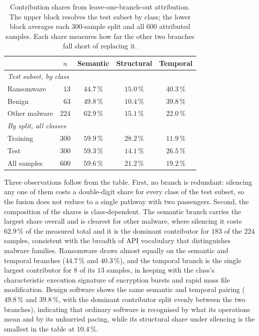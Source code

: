 \documentclass[%
    BCOR=10mm,
    DIV=13,
    toc=bibliography,
    toc=listof,
    oneside,
    12pt,
]{scrbook}
\begin{document}
\begin{table}[H]
\centering
\caption[Branch contribution shares]{Contribution shares from leave-one-branch-out attribution. The upper
block resolves the test subset by class; the lower block averages each
$300$-sample split and all $600$ attributed samples. Each share measures how far
the other two branches fall short of replacing it.}
\label{tab:branch_contributions}
\begin{tabular}{l r ccc}
\toprule
 & \multicolumn{1}{c}{$n$} & \textbf{Semantic} & \textbf{Structural} & \textbf{Temporal} \\
\midrule
\multicolumn{5}{l}{\textit{Test subset, by class}} \\
Ransomware    & $13$  & $44.7\,\%$ & $15.0\,\%$ & $40.3\,\%$ \\
Benign        & $63$  & $49.8\,\%$ & $10.4\,\%$ & $39.8\,\%$ \\
Other malware & $224$ & $62.9\,\%$ & $15.1\,\%$ & $22.0\,\%$ \\
\midrule
\multicolumn{5}{l}{\textit{By split, all classes}} \\
Training      & $300$ & $59.9\,\%$ & $28.2\,\%$ & $11.9\,\%$ \\
Test          & $300$ & $59.3\,\%$ & $14.1\,\%$ & $26.5\,\%$ \\
\midrule
All samples   & $600$ & $59.6\,\%$ & $21.2\,\%$ & $19.2\,\%$ \\
\bottomrule
\end{tabular}
\end{table}

Three observations follow from the table. First, no branch is redundant:
silencing any one of them costs a double-digit share for every class of the
test subset, so the fusion does not reduce to a single pathway with two
passengers. Second, the composition of the shares is class-dependent. The
semantic branch carries the largest share overall and is clearest for other
malware, where silencing it costs $62.9\,\%$ of the measured total and it is
the dominant contributor for $183$ of the $224$ samples, consistent with the
breadth of API vocabulary that distinguishes malware families. Ransomware draws
almost equally on the semantic and temporal branches ($44.7\,\%$ and
$40.3\,\%$), and the temporal branch is the single largest contributor for $8$
of its $13$ samples, in keeping with the class's characteristic execution
signature of encryption bursts and rapid mass file modification. Benign
software shows the same semantic and temporal pairing ($49.8\,\%$ and
$39.8\,\%$, with the dominant contributor split evenly between the two
branches), indicating that ordinary software is recognised by what its
operations mean and by its unhurried pacing, while its structural share under
silencing is the smallest in the table at $10.4\,\%$.
\end{document}
